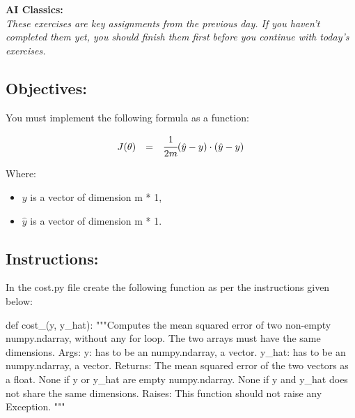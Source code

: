 \documentclass[]{article}
\newenvironment{Shaded}{\begin{snugshade}}{\end{snugshade}}
\newcommand{\CommentTok}[1]{\textcolor[rgb]{0.48,0.49,0.49}{#1}}
\newcommand{\KeywordTok}[1]{\textcolor[rgb]{0.81,0.81,0.76}{#1}}
\newcommand{\NormalTok}[1]{\textcolor[rgb]{0.81,0.81,0.76}{#1}}
\begin{document}
\textbf{AI Classics:}\\
\emph{These exercises are key assignments from the previous day. If you
haven't completed them yet, you should finish them first before you
continue with today's exercises.}

\hypertarget{objectives-1}{%
\subsection{Objectives:}\label{objectives-1}}

You must implement the following formula as a function:

\large

\[
\begin{matrix}
J(\theta) & = & \cfrac{1}{2m}(\hat{y} - y)\cdot(\hat{y}- y) 
\end{matrix}
\] \normalsize

Where:

\begin{itemize}
\item
  \(y\) is a vector of dimension m * 1,
\item
  \(\hat{y}\) is a vector of dimension m * 1.
\end{itemize}

\hypertarget{instructions-1}{%
\subsection{Instructions:}\label{instructions-1}}

In the cost.py file create the following function as per the
instructions given below:

\begin{Shaded}
\begin{Highlighting}[]
\KeywordTok{def}\NormalTok{ cost_(y, y_hat):}
    \CommentTok{"""Computes the mean squared error of two non-empty numpy.ndarray, without any for loop. The two arrays must have the same dimensions.}
\CommentTok{    Args:}
\CommentTok{      y: has to be an numpy.ndarray, a vector.}
\CommentTok{      y_hat: has to be an numpy.ndarray, a vector.}
\CommentTok{    Returns:}
\CommentTok{      The mean squared error of the two vectors as a float.}
\CommentTok{      None if y or y_hat are empty numpy.ndarray.}
\CommentTok{      None if y and y_hat does not share the same dimensions.}
\CommentTok{    Raises:}
\CommentTok{      This function should not raise any Exception.}
\CommentTok{    """}
\end{Highlighting}
\end{Shaded}
\end{document}
